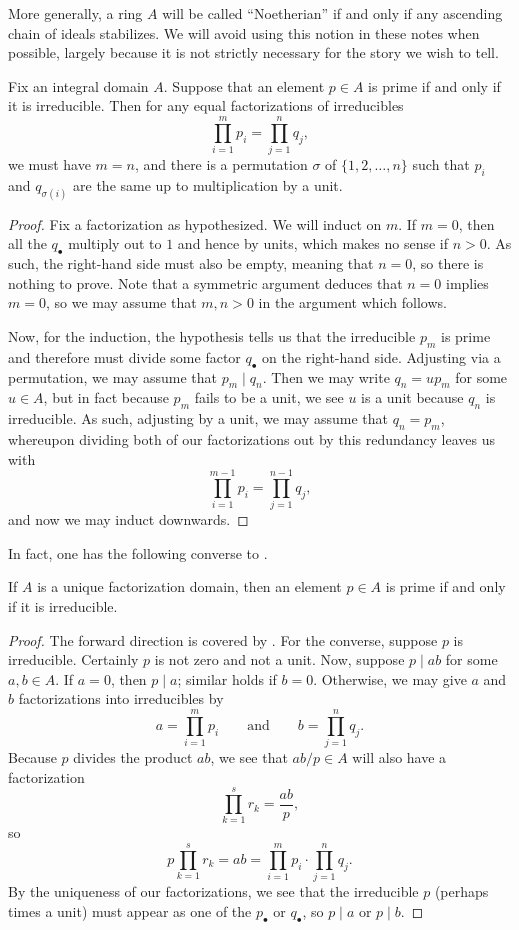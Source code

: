 \documentclass[../notes.tex]{subfiles}
\begin{document}
\begin{remark}
	More generally, a ring $A$ will be called ``Noetherian'' if and only if any ascending chain of ideals stabilizes. We will avoid using this notion in these notes when possible, largely because it is not strictly necessary for the story we wish to tell.
\end{remark}
\begin{lemma} \label{lem:get-uniq-factorization}
	Fix an integral domain $A$. Suppose that an element $p\in A$ is prime if and only if it is irreducible. Then for any equal factorizations of irreducibles
	\[\prod_{i=1}^mp_i=\prod_{j=1}^nq_j,\]
	we must have $m=n$, and there is a permutation $\sigma$ of $\{1,2,\ldots,n\}$ such that $p_i$ and $q_{\sigma(i)}$ are the same up to multiplication by a unit.
\end{lemma}
\begin{proof}
	Fix a factorization as hypothesized. We will induct on $m$. If $m=0$, then all the $q_\bullet$ multiply out to $1$ and hence by units, which makes no sense if $n>0$. As such, the right-hand side must also be empty, meaning that $n=0$, so there is nothing to prove. Note that a symmetric argument deduces that $n=0$ implies $m=0$, so we may assume that $m,n>0$ in the argument which follows.

	Now, for the induction, the hypothesis tells us that the irreducible $p_m$ is prime and therefore must divide some factor $q_\bullet$ on the right-hand side. Adjusting via a permutation, we may assume that $p_m\mid q_n$. Then we may write $q_n=up_m$ for some $u\in A$, but in fact because $p_m$ fails to be a unit, we see $u$ is a unit because $q_n$ is irreducible. As such, adjusting by a unit, we may assume that $q_n=p_m$, whereupon dividing both of our factorizations out by this redundancy leaves us with
	\[\prod_{i=1}^{m-1}p_i=\prod_{j=1}^{n-1}q_j,\]
	and now we may induct downwards.
\end{proof}
In fact, one has the following converse to .
\begin{lemma} \label{lem:prime-is-irred-for-ufd}
	If $A$ is a unique factorization domain, then an element $p\in A$ is prime if and only if it is irreducible.
\end{lemma}
\begin{proof}
	The forward direction is covered by . For the converse, suppose $p$ is irreducible. Certainly $p$ is not zero and not a unit. Now, suppose $p\mid ab$ for some $a,b\in A$. If $a=0$, then $p\mid a$; similar holds if $b=0$. Otherwise, we may give $a$ and $b$ factorizations into irreducibles by
	\[a=\prod_{i=1}^mp_i\qquad\text{and}\qquad b=\prod_{j=1}^nq_j.\]
	Because $p$ divides the product $ab$, we see that $ab/p\in A$ will also have a factorization
	\[\prod_{k=1}^sr_k=\frac{ab}{p},\]
	so
	\[p\prod_{k=1}^sr_k=ab=\prod_{i=1}^mp_i\cdot\prod_{j=1}^nq_j.\]
	By the uniqueness of our factorizations, we see that the irreducible $p$ (perhaps times a unit) must appear as one of the $p_\bullet$ or $q_\bullet$, so $p\mid a$ or $p\mid b$.
\end{proof}
\end{document}
